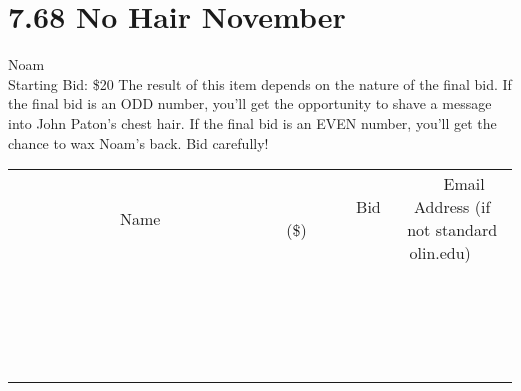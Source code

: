 \documentclass[11pt]{article}
\begin{document}
\section*{7.68 No Hair November}
Noam
\\
Starting Bid: \$20
\newline
The result of this item depends on the nature of the final bid.
If the final bid is an ODD number, you'll get the opportunity to shave a message into John Paton's chest hair.
If the final bid is an EVEN number, you'll get the chance to wax Noam's back.
Bid carefully!
\\[3ex]
\begin{tabular}{c c c}
~~~~~~~~~~~~~Name~~~~~~~~~~~~~ & ~~~~~~~~~Bid (\$)~~~~~~~~~  & ~~~Email Address (if not standard olin.edu)~~~\\
 & & \\
\hline
 & & \\
\hline
 & & \\
\hline
 & & \\
\hline
 & & \\
\hline
 & & \\
\hline
 & & \\
\hline
 & & \\
\hline
 & & \\
\hline
 & & \\
\hline
 & & \\
\hline
 & & \\
\hline
 & & \\
\hline
 & & \\
\hline
 & & \\
\hline
 & & \\
\hline
 & & \\
\hline
 & & \\
\hline
 & & \\
\hline
\end{tabular}
\newpage
\end{document}
